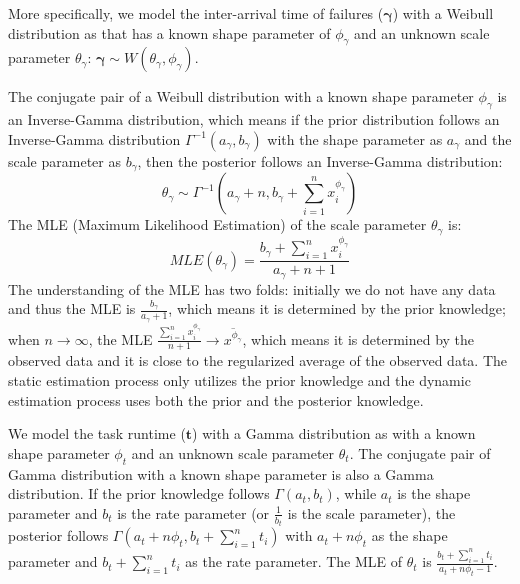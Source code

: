 \documentclass{IOS-Book-Article}
\begin{document}
More specifically, we model the inter-arrival time of failures ($\bm\gamma$) with a Weibull distribution as \cite{Schroeder2006} that has a known shape parameter of $\phi_{\gamma}$ and an unknown scale parameter $\theta_{\gamma}$: $\bm\gamma\sim W(\theta_{\gamma}, \phi_{\gamma})$. 

The conjugate pair of a Weibull distribution with a known shape parameter $\phi_{\gamma}$ is an Inverse-Gamma distribution, which means if the prior distribution follows an Inverse-Gamma distribution $\Gamma^{-1}(a_{\gamma}, b_{\gamma})$ with the shape parameter as $a_{\gamma}$ and the scale parameter as $b_{\gamma}$, then the posterior follows an Inverse-Gamma distribution:
\begin{equation}
\theta_{\gamma}\sim\Gamma^{-1}(a_{\gamma}+n,\displaystyle b_{\gamma}+\sum_{i=1}^n{x_i^{\phi_{\gamma}}})
\label{eq:theta-1}
 \end{equation}
The MLE (Maximum Likelihood Estimation) of the scale parameter $\theta_{\gamma}$ is:
\begin{equation}
MLE(\theta_{\gamma})=\displaystyle\frac{b_{\gamma}+\displaystyle\sum_{i=1}^n{x_i^{\phi_{\gamma}}}}{a_{\gamma}+n+1}
\end{equation}
The understanding of the MLE has two folds: initially we do not have any data and thus the MLE is $\displaystyle\frac{b_{\gamma}}{a_{\gamma}+1}$, which means it is determined by the prior knowledge; when $n\to\infty$, the MLE $\displaystyle\frac{\displaystyle\sum_{i=1}^n{x_i^{\phi_{\gamma}}}}{n+1}\to\overline{x^{\phi_{\gamma}}}$, which means it is determined by the observed data and it is close to the regularized average of the observed data. The static estimation process only utilizes the prior knowledge and the dynamic estimation process uses both the prior and the posterior knowledge. 

We model the task runtime ($\bm t$) with a Gamma distribution as \cite{Sun2003, Iosup2008} with a known shape parameter $\phi_{t}$ and an unknown scale parameter $\theta_t$. The conjugate pair of Gamma distribution with a known shape parameter is also a Gamma distribution. If the prior  knowledge follows $\Gamma(a_t, b_t)$, while $a_t$ is the shape parameter and $b_t$ is the rate parameter (or $\displaystyle \frac{1}{b_t}$ is the scale parameter), the posterior follows $\Gamma(a_t+n\phi_t, b_t+\displaystyle\sum_{i=1}^n{t_i})$ with $a_t+n\phi_t$ as the shape parameter and $b_t+\displaystyle\sum_{i=1}^n{t_i}$ as the rate parameter. The MLE of $\theta_t$ is $\displaystyle\frac{b_t+\displaystyle\sum_{i=1}^n{t_i}}{a_t+n\phi_t-1}$. 
\end{document}
